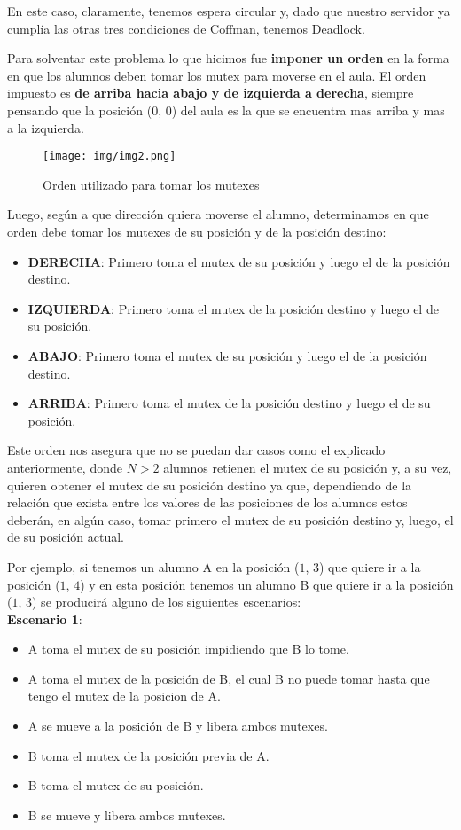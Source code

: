 En este caso, claramente, tenemos espera circular y, dado que nuestro servidor ya cumplía las otras tres condiciones de Coffman, tenemos Deadlock.

Para solventar este problema lo que hicimos fue \textbf{imponer un orden} en la forma en que los alumnos deben tomar los mutex para moverse en el aula.
El orden impuesto es \textbf{de arriba hacia abajo y de izquierda a derecha}, siempre pensando que la posición ($0$, $0$) del aula es la que se encuentra mas arriba y mas a la izquierda.

\begin{figure}[H]
\begin{center}
\texttt{[image: img/img2.png]}
     \caption{Orden utilizado para tomar los mutexes}
\end{center}
\end{figure}

Luego, según a que dirección quiera moverse el alumno, determinamos en que orden debe tomar los mutexes de su posición y de la posición destino:

\begin{itemize}
	\item \textbf{DERECHA}: Primero toma el mutex de su posición y luego el de la posición destino.
	\item \textbf{IZQUIERDA}: Primero toma el mutex de la posición destino y luego el de su posición.
	\item \textbf{ABAJO}:  Primero toma el mutex de su posición y luego el de la posición destino.
	\item \textbf{ARRIBA}: Primero toma el mutex de la posición destino y luego el de su posición.
\end{itemize}

Este orden nos asegura que no se puedan dar casos como el explicado anteriormente, donde $N > 2$ alumnos retienen el mutex de su posición y, a su vez, quieren obtener el mutex de su posición destino ya que, dependiendo de la relación que exista entre los valores de las posiciones de los alumnos estos deberán, en algún caso, tomar primero el mutex de su posición destino y, luego, el de su posición actual.

Por ejemplo, si tenemos un alumno A en la posición ($1$, $3$) que quiere ir a la posición ($1$, $4$) y en esta posición tenemos un alumno B que quiere ir a la posición ($1$, $3$) se producirá alguno de los siguientes escenarios:\\

\textbf{Escenario 1}:
\begin{itemize}
	\item A toma el mutex de su posición impidiendo que B lo tome.
	\item A toma el mutex de la posición de B, el cual B no puede tomar hasta que tengo el mutex de la posicion de A.
	\item A se mueve a la posición de B y libera ambos mutexes.
	\item B toma el mutex de la posición previa de A.
	\item B toma el mutex de su posición.
	\item B se mueve y libera ambos mutexes.
\end{itemize}


